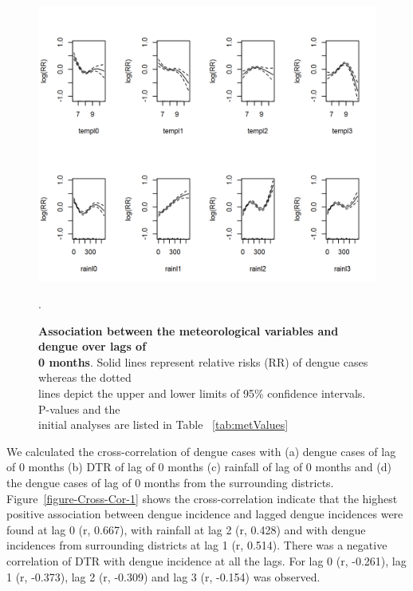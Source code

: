 \documentclass{bmcart}
\begin{document}
\begin{figure}[htbp]
	\begin{center}
		\includegraphics[width= 1.0\textwidth]{6-DM1}
		\caption{\textbf{Association between the meteorological variables and dengue over lags of \\ 0 months}. Solid lines represent relative risks (RR) of dengue cases whereas the dotted \\ lines depict the upper and lower limits of 95\%  confidence intervals. P-values and the \\ initial analyses are listed in Table ~\ref{tab:metValues}}
		\label{figure:D-M-1}.
	\end{center}
\end{figure}





We calculated the cross-correlation of dengue cases with (a) dengue cases of lag of 0 months (b) DTR of lag of 0 months (c) rainfall of lag of 0 months and (d) the dengue cases of lag of 0 months from the surrounding districts. Figure~\ref{figure-Cross-Cor-1} shows the cross-correlation indicate that the highest positive association between dengue incidence and lagged dengue incidences were found at lag 0 (r, 0.667), with rainfall at lag 2 (r, 0.428) and with dengue incidences from surrounding districts at lag 1 (r, 0.514). There was a negative correlation of DTR with dengue incidence at all the lags. For lag 0 (r, -0.261), lag 1 (r, -0.373), lag 2 (r,  -0.309) and lag 3 (r,  -0.154) was observed. 
\end{document}
